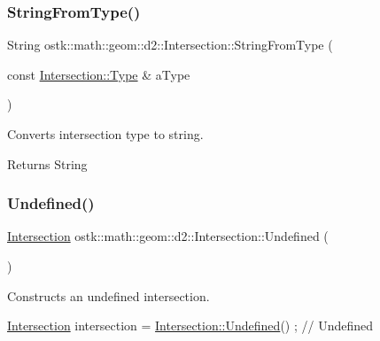 \subsubsection{\texorpdfstring{String\+From\+Type()}{StringFromType()}}
{\footnotesize\ttfamily String ostk\+::math\+::geom\+::d2\+::\+Intersection\+::\+String\+From\+Type (\begin{DoxyParamCaption}\item[{const \hyperlink{classostk_1_1math_1_1geom_1_1d2_1_1_intersection_a8712ffbb37647ed5212ff8ba6da68b00}{Intersection\+::\+Type} \&}]{a\+Type }\end{DoxyParamCaption})\hspace{0.3cm}{\ttfamily [static]}}



Converts intersection type to string. 

\begin{DoxyReturn}{Returns}
String 
\end{DoxyReturn}
\mbox{\label{classostk_1_1math_1_1geom_1_1d2_1_1_intersection_a76e5968ec64adf609ce13a381a04251c}} 
\subsubsection{\texorpdfstring{Undefined()}{Undefined()}}
{\footnotesize\ttfamily \hyperlink{classostk_1_1math_1_1geom_1_1d2_1_1_intersection}{Intersection} ostk\+::math\+::geom\+::d2\+::\+Intersection\+::\+Undefined (\begin{DoxyParamCaption}{ }\end{DoxyParamCaption})\hspace{0.3cm}{\ttfamily [static]}}



Constructs an undefined intersection. 


\begin{DoxyCode}
\hyperlink{classostk_1_1math_1_1geom_1_1d2_1_1_intersection_a52e7ba577832b73a1eb5c95eaddf2834}{Intersection} intersection = \hyperlink{classostk_1_1math_1_1geom_1_1d2_1_1_intersection_a76e5968ec64adf609ce13a381a04251c}{Intersection::Undefined}() ; \textcolor{comment}{// Undefined}
\end{DoxyCode}


